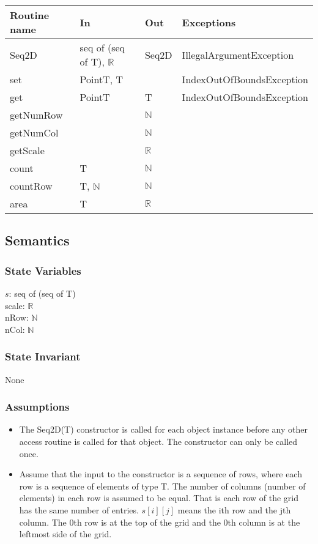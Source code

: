 \documentclass[12pt]{article}
\begin{document}
\begin{tabular}{| l | l | l | p{6cm} |}
\hline
\textbf{Routine name} & \textbf{In} & \textbf{Out} & \textbf{Exceptions}\\
\hline
Seq2D & seq of (seq of T), $\mathbb{R}$ & Seq2D & IllegalArgumentException\\
\hline
set & PointT, T & ~ & IndexOutOfBoundsException\\
\hline
get & PointT & T & IndexOutOfBoundsException\\
\hline
getNumRow & ~ & $\mathbb{N}$ & \\
\hline
getNumCol & ~ & $\mathbb{N}$ & \\
\hline
getScale & ~ & $\mathbb{R}$ & \\
\hline
count & T & $\mathbb{N}$ & \\
\hline
countRow & T, $\mathbb{N}$ & $\mathbb{N}$ & \\
\hline
area & T & $\mathbb{R}$ & \\
\hline
\end{tabular}

\subsection* {Semantics}

\subsubsection* {State Variables}

$s$: seq of (seq of T)\\
scale: $\mathbb{R}$\\
nRow: $\mathbb{N}$\\
nCol: $\mathbb{N}$

\subsubsection* {State Invariant}

None

\subsubsection* {Assumptions}

\begin{itemize}
\item The Seq2D(T) constructor is called for each object instance before any
other access routine is called for that object.  The constructor can only be
called once.
\item Assume that the input to the constructor is a sequence of rows, where each
  row is a sequence of elements of type T.  The number of columns (number of
  elements) in each row is assumed to be equal. That is each row
  of the grid has the same number of entries.  $s[i][j]$ means the ith row and
  the jth column.  The 0th row is at the top of the grid and the 0th column
  is at the leftmost side of the grid.
\end{itemize}
\end{document}
